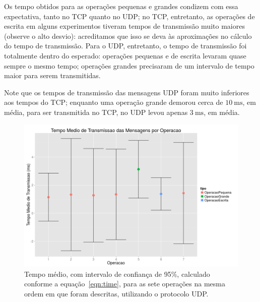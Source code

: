 \documentclass[12pt,a4paper]{article}
\begin{document}
Os tempo obtidos para as operações pequenas e grandes condizem com essa expectativa, tanto no TCP quanto no UDP; no TCP, entretanto, as operações de escrita em alguns experimentos tiveram tempos de transmissão muito maiores (observe o alto desvio): acreditamos que isso se deva às aproximações no cálculo do tempo de transmissão. Para o UDP, entretanto, o tempo de transmissão foi totalmente dentro do esperado: operações pequenas e de escrita levaram quase sempre o mesmo tempo; operações grandes precisaram de um intervalo de tempo maior para serem transmitidas.

Note que os tempos de transmissão das mensagens UDP foram muito inferiores aos tempos do TCP;  enquanto uma operação grande demorou cerca de $\SI{10}{\milli\second}$, em média, para ser transmitida no TCP, no UDP levou apenas $\SI{3}{\milli\second}$, em média.

\begin{figure}[h]
\centering
\includegraphics[width=\textwidth]{diagrama/resultadosTempoTransmissaoUDP.png}
\caption{Tempo médio, com intervalo de confiança de 95\%, calculado conforme a equação~\ref{eqn:time}, para as sete operações na mesma ordem em que foram descritas, utilizando o protocolo UDP.}
\label{fig:transmissaoU}
\end{figure}
\end{document}
